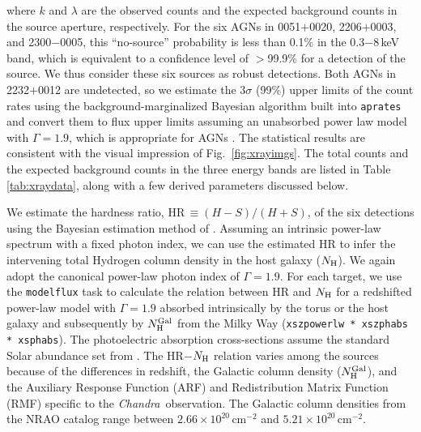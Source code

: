 \documentclass[iop,revtex4,twocolumn,apj,numberedappendix,appendixfloats]{emulateapj}
\newcommand{\chandra}{{\it Chandra}}
\begin{document}
where $k$ and $\lambda$ are the observed counts and the expected background counts in the source aperture, respectively. For the six AGNs in 0051$+$0020, 2206$+$0003, and 2300$-$0005, this ``no-source'' probability is less than 0.1\% in the 0.3$-$8\,keV band, which is equivalent to a confidence level of $>$99.9\% for a detection of the source. We thus consider these six sources as robust detections. Both AGNs in 2232$+$0012 are undetected, so we estimate the 3$\sigma$ (99\%) upper limits of the count rates using the background-marginalized Bayesian algorithm built into \texttt{aprates} and convert them to flux upper limits assuming an unabsorbed power law model with $\Gamma = 1.9$, which is appropriate for AGNs \citep[e.g.,][]{Just07,She17}. The statistical results are consistent with the visual impression of Fig.~\ref{fig:xrayimgs}. The total counts and the expected background counts in the three energy bands are listed in Table\,\ref{tab:xraydata}, along with a few derived parameters discussed below.

We estimate the hardness ratio, HR\,$\equiv (H-S)/(H+S)$, of the six detections using the Bayesian estimation method of \citet{Park06}. Assuming an intrinsic power-law spectrum with a fixed photon index, we can use the estimated HR to infer the intervening total Hydrogen column density in the host galaxy ($N_{\rm H}$). We again adopt the canonical power-law photon index of $\Gamma = 1.9$. For each target, we use the \texttt{modelflux} task to calculate the relation between HR and $N_{\rm H}$ for a redshifted power-law model with $\Gamma = 1.9$ absorbed intrinsically by the torus or the host galaxy and subsequently by $N_{\rm H}^{\rm Gal}$ from the Milky Way (\texttt{xszpowerlw * xszphabs * xsphabs}). The photoelectric absorption cross-sections \citep{Morrison83} assume the standard Solar abundance set from \citet{Anders89}. The HR$-$$N_{\rm H}$ relation varies among the sources because of the differences in redshift, the Galactic column density ($N_{\rm H}^{\rm Gal}$), and the Auxiliary Response Function (ARF) and Redistribution Matrix Function (RMF) specific to the \chandra\ observation. The Galactic column densities from the NRAO catalog \citep{Dickey90} range between $2.66\times10^{20}$\,cm$^{-2}$ and $5.21\times10^{20}$\,cm$^{-2}$. 
\end{document}
